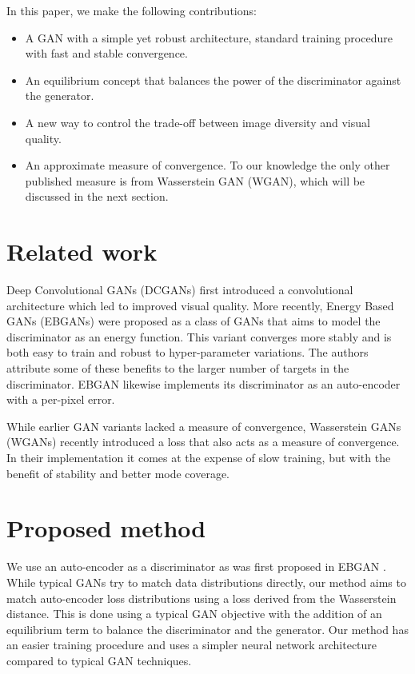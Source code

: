 \documentclass[english]{article}
\begin{document}
In this paper, we make the following contributions:
\begin{itemize}
\item A GAN with a simple yet robust architecture, standard training procedure
with fast and stable convergence.
\item An equilibrium concept that balances the power of the discriminator
against the generator. 
\item A new way to control the trade-off between image diversity and visual
quality.
\item An approximate measure of convergence. To our knowledge the only other
published measure is from Wasserstein GAN \cite{arjovsky2017wasserstein}
(WGAN), which will be discussed in the next section.
\end{itemize}

\section{Related work}

Deep Convolutional GANs \cite{radford2015unsupervised_dcgan}(DCGANs)
first introduced a convolutional architecture which led to improved
visual quality. More recently, Energy Based GANs \cite{zhao2016energy_ebgan}(EBGANs)
were proposed as a class of GANs that aims to model the discriminator
 as an energy function. This variant converges more stably
and is both easy to train and robust to hyper-parameter variations.
The authors attribute some of these benefits to the larger number
of targets in the discriminator. EBGAN likewise implements its discriminator
as an auto-encoder with a per-pixel error.

While earlier GAN variants lacked a measure of convergence, Wasserstein
GANs \cite{arjovsky2017wasserstein} (WGANs) recently introduced a
loss that also acts as a measure of convergence. In their implementation
it comes at the expense of slow training, but with the benefit of
stability and better mode coverage.


\section{Proposed method}

We use an auto-encoder as a discriminator as was first proposed in
EBGAN \cite{zhao2016energy_ebgan}. While typical GANs try to match
data distributions directly, our method aims to match auto-encoder
loss distributions using a loss derived from the Wasserstein distance.
This is done using a typical GAN objective with the addition of an
equilibrium term to balance the discriminator and the generator. Our
method has an easier training procedure and uses a simpler neural
network architecture compared to typical GAN techniques. 
\end{document}
